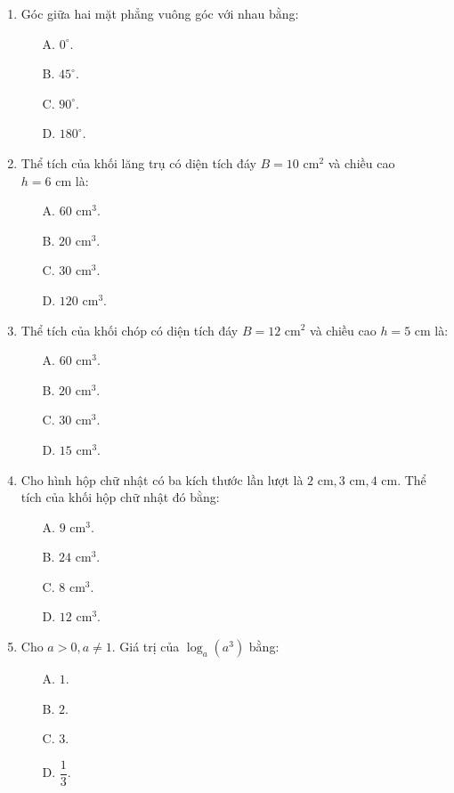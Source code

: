 \documentclass[12pt, a4paper]{article}
\begin{document}
\begin{enumerate}[leftmargin=0.8cm]
    \item Góc giữa hai mặt phẳng vuông góc với nhau bằng:
    \begin{enumerate}[leftmargin=0.6cm]
        \item[A.] $0^\circ$.
        \item[B.] $45^\circ$.
        \item[C.] $90^\circ$.
        \item[D.] $180^\circ$.
    \end{enumerate}

    \item Thể tích của khối lăng trụ có diện tích đáy $B = 10\text{ cm}^2$ và chiều cao $h = 6\text{ cm}$ là:
    \begin{enumerate}[leftmargin=0.6cm]
        \item[A.] $60\text{ cm}^3$.
        \item[B.] $20\text{ cm}^3$.
        \item[C.] $30\text{ cm}^3$.
        \item[D.] $120\text{ cm}^3$.
    \end{enumerate}

    \item Thể tích của khối chóp có diện tích đáy $B = 12\text{ cm}^2$ và chiều cao $h = 5\text{ cm}$ là:
    \begin{enumerate}[leftmargin=0.6cm]
        \item[A.] $60\text{ cm}^3$.
        \item[B.] $20\text{ cm}^3$.
        \item[C.] $30\text{ cm}^3$.
        \item[D.] $15\text{ cm}^3$.
    \end{enumerate}

    \item Cho hình hộp chữ nhật có ba kích thước lần lượt là $2\text{ cm}, 3\text{ cm}, 4\text{ cm}$. Thể tích của khối hộp chữ nhật đó bằng:
    \begin{enumerate}[leftmargin=0.6cm]
        \item[A.] $9\text{ cm}^3$.
        \item[B.] $24\text{ cm}^3$.
        \item[C.] $8\text{ cm}^3$.
        \item[D.] $12\text{ cm}^3$.
    \end{enumerate}

    \item Cho $a > 0, a \ne 1$. Giá trị của $\log_a (a^3)$ bằng:
    \begin{enumerate}[leftmargin=0.6cm]
        \item[A.] $1$.
        \item[B.] $2$.
        \item[C.] $3$.
        \item[D.] $\dfrac{1}{3}$.
    \end{enumerate}


\end{enumerate}
\end{document}
